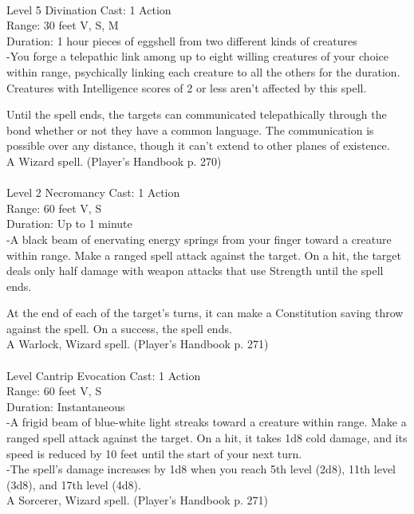 \documentclass[10pt,twocolumn]{report}
\begin{document}
 \\
Level 5 \quad Divination \quad Cast: 1 Action\\
Range: 30 feet \quad V, S, M\\
Duration: 1 hour \quad pieces of eggshell from two different kinds of creatures\\
-You forge a telepathic link among up to eight willing creatures of your choice within range, psychically linking each creature to all the others for the duration. Creatures with Intelligence scores of 2 or less aren’t affected by this spell.

Until the spell ends, the targets can communicated telepathically through the bond whether or not they have a common language. The communication is possible over any distance, though it can’t extend to other planes of existence.\\
A Wizard spell. (Player's Handbook p. 270) \\


 \\
Level 2 \quad Necromancy \quad Cast: 1 Action\\
Range: 60 feet \quad V, S\\
Duration: Up to 1 minute \quad \\
-A black beam of enervating energy springs from your finger toward a creature within range.
Make a ranged spell attack against the target. On a hit, the target deals only half damage with weapon attacks that use Strength until the spell ends.

At the end of each of the target’s turns, it can make a Constitution saving throw against the spell. On a success, the spell ends.\\
A Warlock, Wizard spell. (Player's Handbook p. 271) \\


 \\
Level Cantrip \quad Evocation \quad Cast: 1 Action\\
Range: 60 feet \quad V, S\\
Duration: Instantaneous \quad \\
-A frigid beam of blue-white light streaks toward a creature within range. Make a ranged spell attack against the target. On a hit, it takes 1d8 cold damage, and its speed is reduced by 10 feet until the start of your next turn.\\
-The spell’s damage increases by 1d8 when you reach 5th level (2d8), 11th level (3d8), and 17th level (4d8).\\
A Sorcerer, Wizard spell. (Player's Handbook p. 271) \\
\end{document}

